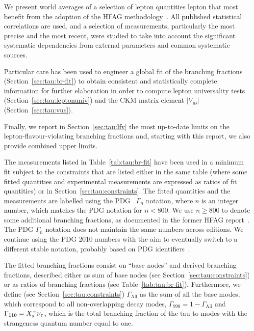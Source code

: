 We present world averages of a selection of \mtau lepton quantities lepton
that most benefit from the adoption of the HFAG
methodology~\cite{Amhis:2012bh}.
All published statistical correlations are used, and a
selection of measurements, particularly the most precise and the most
recent, were studied to take into account the significant systematic
dependencies from external parameters and common systematic sources.

Particular care has been used to engineer a global fit of the \mtau
branching fractions (Section~\ref{sec:tau:br-fit}) to obtain consistent
and statistically complete information for further elaboration in order to
compute lepton universality tests (Section~\ref{sec:tau:leptonuniv}) and
the CKM matrix element $|V_{us}|$ (Section~\ref{sec:tau:vus}).

Finally, we report in Section~\ref{sec:tau:lfv} the most up-to-date limits
on the lepton-flavour-violating \mtau branching fractions and, starting with
this report, we also provide combined upper limits.

\label{sec:tau:br-fit}

The measurements listed in Table~\ref{tab:tau:br-fit} have been used in a
minimum \chisq fit subject to the constraints that are listed
either in the same table (where some fitted quantities and experimental
measurements are expressed as ratios of fit quantities) or in
Section~\ref{sec:tau:constraints}. The fitted quantities and the measurements
are labelled using the PDG~\cite{PDG_2014} $\Gamma_{n}$ notation, where $n$ is
an integer number, which matches the PDG notation for $n<800$. We use
$n\ge 800$ to denote some additional branching fractions, as documented in the
former HFAG report~\cite{Amhis:2012bh}. The PDG $\Gamma_{n}$ notation does
not maintain the same numbers across editions. We continue using the PDG
2010 numbers with the aim to eventually switch to a different stable notation,
probably based on PDG identifiers~\cite{pdg-identifiers-2014}.

The fitted branching fractions consist on  ``base nodes'' and  derived
branching fractions, described either as sum of base nodes (see
Section~\ref{sec:tau:constraints}) or as ratios of branching fractions (see
Table~\ref{tab:tau:br-fit}). Furthermore, we define (see
Section~\ref{sec:tau:constraints}) $\Gamma_{\text{All}}$ as the sum of all
the base modes, which correspond to all non-overlapping \mtau decay modes,
$\Gamma_{998} = 1 -\Gamma_{\text{All}}$ and $\Gamma_{110} =
\BRF{\tau^-}{X_s^- \nu_\tau}$, which is the total branching fraction of the
tau to modes with the strangeness quantum number equal to one.

